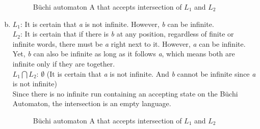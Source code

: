\documentclass{article}
\begin{document}
\begin{enumerate}[(a)]
\begin{figure}[ht]
        \caption{Büchi automaton A that accepts intersection of $L_1$ and $L_2$ }
        \label{fig:state-machine-l1}
    \end{figure}


    \item{
        $L_1$: It is certain that \textit{a} is not infinite. However, \textit{b} can be infinite.\\
        $L_2$: It is certain that if there is \textit{b} at any position, regardless of finite or infinite words, there must be \textit{a} right next to it. However, \textit{a} can be infinite. Yet, \textit{b} can also be infinite as long as it follows \textit{a}, which means both are infinite only if they are together.\\
        $L_1 \bigcap L_2$: $\emptyset$ (It is certain that \textit{a} is not infinite. And \textit{b} cannot be infinite since \textit{a} is not infinite) \\
        Since there is no infinite run containing an accepting state on the Büchi Automaton, the intersection is an empty language.
    }
    \begin{figure}[ht] %
        \centering %
        \caption{Büchi automaton A that accepts intersection of $L_1$ and $L_2$ }
        \label{fig:state-machine-l1}
    \end{figure}
    
\end{enumerate}
\end{document}
